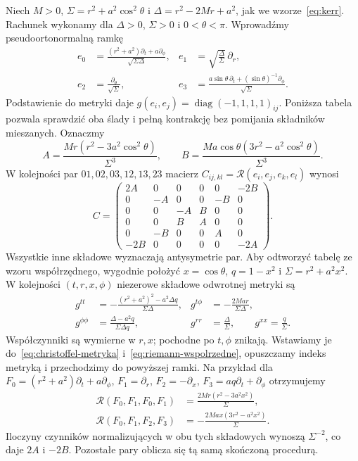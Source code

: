 \begin{przyklad}
\label{prz:krzywizna-kerr}
Niech $M>0$, $\Sigma=r^2+a^2\cos^2\theta$ i
$\Delta=r^2-2Mr+a^2$, jak we wzorze~\eqref{eq:kerr}.
Rachunek wykonamy dla $\Delta>0$, $\Sigma>0$ i
$0<\theta<\pi$. Wprowadźmy pseudoortonormalną ramkę
\[
 \begin{aligned}
 e_0&=\frac{(r^2+a^2)\partial_t+a\partial_\phi}
                  {\sqrt{\Sigma\Delta}},&
 e_1&=\sqrt{\frac\Delta\Sigma}\,\partial_r,\\
 e_2&=\frac{\partial_\theta}{\sqrt\Sigma},&
 e_3&=\frac{a\sin\theta\,\partial_t+
                      (\sin\theta)^{-1}\partial_\phi}{\sqrt\Sigma}.
 \end{aligned}
\]
Podstawienie do metryki daje $g(e_i,e_j)=
\operatorname{diag}(-1,1,1,1)_{ij}$. Poniższa tabela
pozwala sprawdzić oba ślady i pełną kontrakcję bez
pomijania składników mieszanych. Oznaczmy
\[
 A=\frac{Mr(r^2-3a^2\cos^2\theta)}{\Sigma^3},
 \qquad B=\frac{Ma\cos\theta(3r^2-a^2\cos^2\theta)}{\Sigma^3}.
\]
W kolejności par $01,02,03,12,13,23$ macierz
$C_{ij,kl}=\mathcal R(e_i,e_j,e_k,e_l)$ wynosi
\begin{equation}\label{eq:kerr-tabela-krzywizny}
 C=\begin{pmatrix}
 2A&0&0&0&0&-2B\\
 0&-A&0&0&-B&0\\
 0&0&-A&B&0&0\\
 0&0&B&A&0&0\\
 0&-B&0&0&A&0\\
 -2B&0&0&0&0&-2A
 \end{pmatrix}.
\end{equation}
Wszystkie inne składowe wyznaczają antysymetrie par.
Aby odtworzyć tabelę ze wzoru współrzędnego, wygodnie
położyć $x=\cos\theta$, $q=1-x^2$ i $\Sigma=r^2+a^2x^2$.
W kolejności $(t,r,x,\phi)$ niezerowe składowe odwrotnej
metryki są
\[
 \begin{aligned}
 g^{tt}&=-\frac{(r^2+a^2)^2-a^2\Delta q}{\Sigma\Delta},
 &g^{t\phi}&=-\frac{2Mar}{\Sigma\Delta},\\
 g^{\phi\phi}&=\frac{\Delta-a^2q}{\Sigma\Delta q},
 &g^{rr}&=\frac\Delta\Sigma,\qquad g^{xx}=\frac q\Sigma.
 \end{aligned}
\]
Współczynniki są wymierne w $r,x$; pochodne po $t,\phi$
znikają. Wstawiamy je do~\eqref{eq:christoffel-metryka}
i~\eqref{eq:riemann-wspolrzedne}, opuszczamy indeks metryką
i przechodzimy do powyższej ramki. Na przykład dla
$F_0=(r^2+a^2)\partial_t+a\partial_\phi$,
$F_1=\partial_r$, $F_2=-\partial_x$,
$F_3=aq\partial_t+\partial_\phi$ otrzymujemy
\[
 \begin{split}
 \mathcal R(F_0,F_1,F_0,F_1)&=
                  \frac{2Mr(r^2-3a^2x^2)}\Sigma,\\
 \mathcal R(F_0,F_1,F_2,F_3)&=
                 -\frac{2Max(3r^2-a^2x^2)}\Sigma.
 \end{split}
\]
Iloczyny czynników normalizujących w obu tych
składowych wynoszą $\Sigma^{-2}$, co daje $2A$ i $-2B$.
Pozostałe pary oblicza się tą samą skończoną procedurą.


\end{przyklad}
